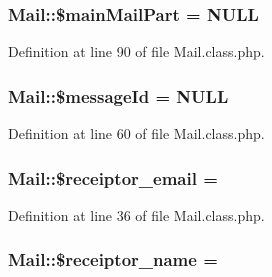 \subsubsection[{\texorpdfstring{\$main\+Mail\+Part}{$mainMailPart}}]{\setlength{\rightskip}{0pt plus 5cm}Mail\+::\$main\+Mail\+Part = N\+U\+LL}\hypertarget{classMail_ad58544ae1c34119ec852e3c22b855624}{}\label{classMail_ad58544ae1c34119ec852e3c22b855624}


Definition at line 90 of file Mail.\+class.\+php.

\subsubsection[{\texorpdfstring{\$message\+Id}{$messageId}}]{\setlength{\rightskip}{0pt plus 5cm}Mail\+::\$message\+Id = N\+U\+LL}\hypertarget{classMail_a48caf58883e736f50ab87a03147c584a}{}\label{classMail_a48caf58883e736f50ab87a03147c584a}


Definition at line 60 of file Mail.\+class.\+php.

\subsubsection[{\texorpdfstring{\$receiptor\+\_\+email}{$receiptor_email}}]{\setlength{\rightskip}{0pt plus 5cm}Mail\+::\$receiptor\+\_\+email = \textquotesingle{}\textquotesingle{}}\hypertarget{classMail_aa034785886f8bdcf3a5ed9c86ce8ed14}{}\label{classMail_aa034785886f8bdcf3a5ed9c86ce8ed14}


Definition at line 36 of file Mail.\+class.\+php.

\subsubsection[{\texorpdfstring{\$receiptor\+\_\+name}{$receiptor_name}}]{\setlength{\rightskip}{0pt plus 5cm}Mail\+::\$receiptor\+\_\+name = \textquotesingle{}\textquotesingle{}}\hypertarget{classMail_a44df4937f3c8b2691e9bbb1220c667f3}{}\label{classMail_a44df4937f3c8b2691e9bbb1220c667f3}


